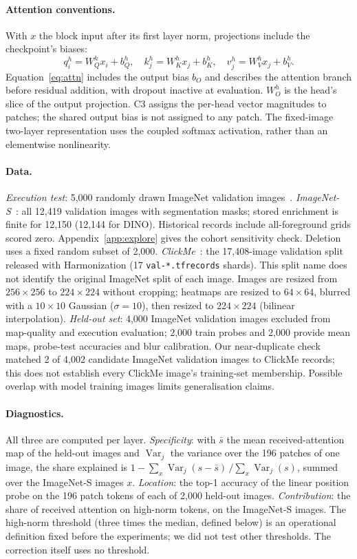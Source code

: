 \paragraph{Attention conventions.} With $x$ the block input after its first layer norm, projections include the checkpoint's biases:
\[
q_i^h=W_Q^hx_i+b_Q^h,\quad k_j^h=W_K^hx_j+b_K^h,\quad v_j^h=W_V^hx_j+b_V^h.
\]
Equation~\ref{eq:attn} includes the output bias $b_O$ and describes the attention branch before residual addition, with dropout inactive at evaluation. $W_O^h$ is the head's slice of the output projection. C3 assigns the per-head vector magnitudes to patches; the shared output bias is not assigned to any patch. The fixed-image two-layer representation uses the coupled softmax activation, rather than an elementwise nonlinearity.

\paragraph{Data.} \emph{Execution test}: 5,000 randomly drawn ImageNet validation images~\citep{deng2009}. \emph{ImageNet-S}~\citep{gao2023}: all 12,419 validation images with segmentation masks; stored enrichment is finite for 12,150 (12,144 for DINO). Historical records include all-foreground grids scored zero. Appendix~\ref{app:explore} gives the cohort sensitivity check. Deletion uses a fixed random subset of 2,000. \emph{ClickMe}~\citep{linsley2019,fel2022}: the 17,408-image validation split released with Harmonization (17 \texttt{val-*.tfrecords} shards). This split name does not identify the original ImageNet split of each image. Images are resized from $256{\times}256$ to $224{\times}224$ without cropping; heatmaps are resized to $64{\times}64$, blurred with a $10{\times}10$ Gaussian ($\sigma=10$), then resized to $224{\times}224$ (bilinear interpolation). \emph{Held-out set}: 4,000 ImageNet validation images excluded from map-quality and execution evaluation; 2,000 train probes and 2,000 provide mean maps, probe-test accuracies and blur calibration. Our near-duplicate check matched 2 of 4,002 candidate ImageNet validation images to ClickMe records; this does not establish every ClickMe image's training-set membership. Possible overlap with model training images limits generalisation claims.

\paragraph{Diagnostics.} All three are computed per layer. \emph{Specificity}: with $\bar s$ the mean received-attention map of the held-out images and $\operatorname{Var}_j$ the variance over the 196 patches of one image, the share explained is $1-\sum_x\operatorname{Var}_j(s-\bar s)\,/\sum_x\operatorname{Var}_j(s)$, summed over the ImageNet-S images $x$. \emph{Location}: the top-1 accuracy of the linear position probe on the 196 patch tokens of each of 2,000 held-out images. \emph{Contribution}: the share of received attention on high-norm tokens, on the ImageNet-S images. The high-norm threshold (three times the median, defined below) is an operational definition fixed before the experiments; we did not test other thresholds. The correction itself uses no threshold.

